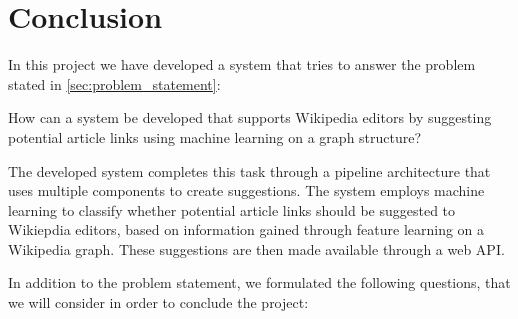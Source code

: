 \chapter{Conclusion}\label{chap:conclusion}
In this project we have developed a system that tries to answer the problem stated in \cref{sec:problem_statement}:
\vspace{1ex} %
\begin{formal}
How can a system be developed that supports Wikipedia editors by suggesting potential article links using machine learning on a graph structure?
\end{formal}

The developed system completes this task through a pipeline architecture that uses multiple components to create suggestions. The system employs machine learning to classify whether potential article links should be suggested to Wikiepdia editors, based on information gained through feature learning on a Wikipedia graph. These suggestions are then made available through a web API.

In addition to the problem statement, we formulated the following questions, that we will consider in order to conclude the project:
\subproblems


